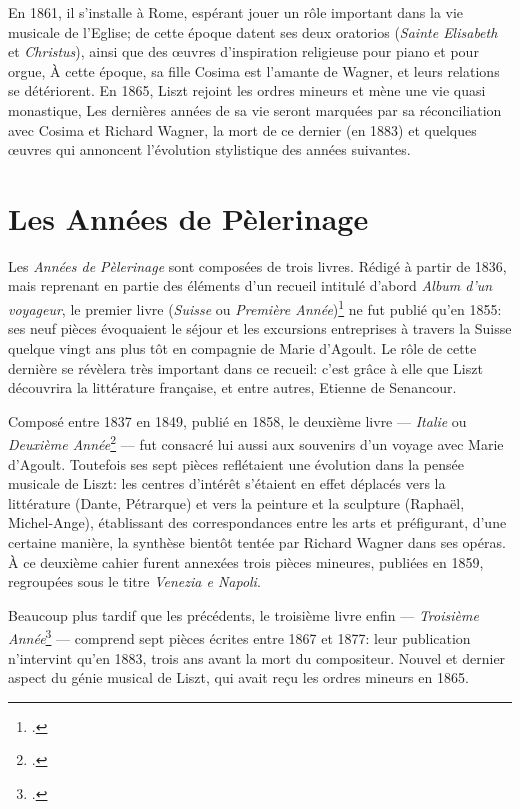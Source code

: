 \documentclass[11pt,a4paper]{scrartcl}
\begin{document}
En 1861, il s'installe à Rome, espérant jouer un rôle important dans la vie musicale de l'Eglise; de cette époque datent
ses deux oratorios (\emph{Sainte Elisabeth} et \emph{Christus}), ainsi que des \oe{}uvres d'inspiration religieuse pour piano et pour orgue,
À cette époque, sa fille Cosima est l'amante de Wagner, et leurs relations se détériorent. En 1865, Liszt rejoint les ordres
mineurs et mène une vie quasi monastique, Les dernières années de sa vie seront marquées par sa réconciliation avec
Cosima et Richard Wagner, la mort de ce dernier (en 1883) et quelques \oe{}uvres qui annoncent l'évolution
stylistique des années suivantes.

\section{Les Années de Pèlerinage}

Les \emph{Années de Pèlerinage} sont composées de trois livres. Rédigé à partir de 1836, mais reprenant en partie des
éléments d'un recueil intitulé d'abord \emph{Album d'un voyageur}, le premier livre (\emph{Suisse} ou \emph{Première Année})\footcite{liszt:pelerinage1} ne fut
publié qu'en 1855: ses neuf pièces évoquaient le séjour et les excursions entreprises à travers la Suisse quelque vingt ans
plus tôt en compagnie de Marie d'Agoult. Le rôle de cette dernière se révèlera très important dans ce recueil: c'est grâce
à elle que Liszt découvrira la littérature française, et entre autres, Etienne de Senancour.

Composé entre 1837 en 1849, publié en 1858, le deuxième livre --- \emph{Italie} ou \emph{Deuxième Année}\footcite{liszt:pelerinage2} --- fut consacré lui aussi aux
souvenirs d'un voyage avec Marie d'Agoult. Toutefois ses sept pièces reflétaient une évolution dans la pensée musicale
de Liszt: les centres d'intérêt s'étaient en effet déplacés vers la littérature (Dante, Pétrarque) et vers la peinture et la
sculpture (Raphaël, Michel-Ange), établissant des correspondances entre les arts et préfigurant, d'une certaine manière,
la synthèse bientôt tentée par Richard Wagner dans ses opéras.
À ce deuxième cahier furent annexées trois pièces mineures, publiées en 1859, regroupées sous le titre
\emph{Venezia e Napoli}.

Beaucoup plus tardif que les précédents, le troisième livre enfin --- \emph{Troisième Année}\footcite{liszt:pelerinage3} --- comprend sept pièces écrites entre
1867 et 1877: leur publication n'intervint qu'en 1883, trois ans avant la mort du compositeur. Nouvel et dernier aspect
du génie musical de Liszt, qui avait reçu les ordres mineurs en 1865.
\end{document}
